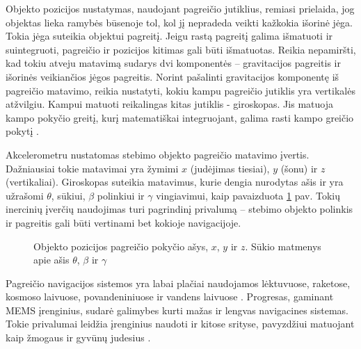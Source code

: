 

Objekto pozicijos nustatymas, naudojant pagreičio jutiklius, remiasi prielaida, jog objektas lieka ramybės būsenoje tol, kol jį nepradeda veikti kažkokia išorinė jėga. 
Tokia jėga suteikia objektui pagreitį. 
Jeigu rastą pagreitį galima išmatuoti ir suintegruoti, pagreičio ir pozicijos kitimas gali būti išmatuotas. 
Reikia nepamiršti, kad tokiu atveju matavimą sudarys dvi komponentės -- gravitacijos pagreitis ir išorinės veikiančios jėgos pagreitis. 
Norint pašalinti gravitacijos komponentę iš pagreičio matavimo, reikia nustatyti, kokiu kampu pagreičio jutiklis yra vertikalės atžvilgiu.
Kampui matuoti reikalingas kitas jutiklis - giroskopas.
Jis matuoja kampo pokyčio greitį, kurį matematiškai integruojant, galima rasti kampo greičio pokytį \cite{sukkarieh2000low}.

Akcelerometru nustatomas stebimo objekto pagreičio matavimo įvertis.
Dažniausiai tokie matavimai yra žymimi $x$ (judėjimas tiesiai), $y$ (šonu) ir $z$ (vertikaliai). 
Giroskopas suteikia matavimus, kurie dengia nurodytas ašis ir yra užrašomi $\theta$, sūkiui, $\beta$ polinkiui ir $\gamma$ vingiavimui, kaip pavaizduota \ref{tikz:axis_of_the_system} pav. 
Tokių inercinių įverčių naudojimas turi pagrindinį privalumą -- stebimo objekto polinkis ir pagreitis gali būti vertinami bet kokioje navigacijoje.  

\begin{figure}[H]
    \centering
    \caption{Objekto pozicijos pagreičio pokyčio ašys, $x$, $y$ ir $z$. Sūkio matmenys apie ašis $\theta$, $\beta$ ir $\gamma$}
    \label{tikz:axis_of_the_system}
\end{figure}

Pagreičio navigacijos sistemos yra labai plačiai naudojamos lėktuvuose, raketose, kosmoso laivuose, povandeniniuose ir vandens laivuose \cite{woodman2007introduction}.
Progresas, gaminant MEMS įrenginius, sudarė galimybes kurti mažas ir lengvas navigacines sistemas.
Tokie privalumai leidžia įrenginius naudoti ir kitose srityse, pavyzdžiui matuojant kaip žmogaus ir gyvūnų judesius \cite{schlomer2008gesture,suvorova2012action}.


